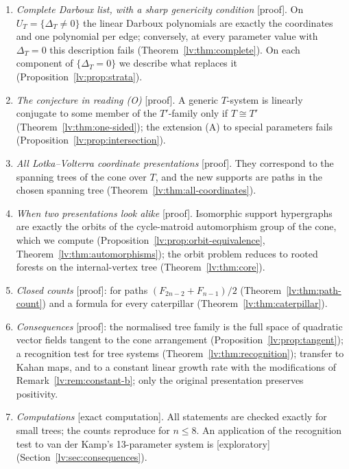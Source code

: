 \documentclass[11pt,a4paper]{article}
\theoremstyle{definition}
\theoremstyle{remark}
\newcommand{\lab}[1]{\textsf{[#1]}}
\begin{document}
\begin{enumerate}
\item \emph{Complete Darboux list, with a sharp genericity condition} \lab{proof}. On $U_T=\{\Delta_T\neq0\}$ the linear Darboux polynomials are exactly the coordinates and one polynomial per edge; conversely, at every parameter value with $\Delta_T=0$ this description fails (Theorem~\ref{lv:thm:complete}). On each component of $\{\Delta_T=0\}$ we describe what replaces it (Proposition~\ref{lv:prop:strata}).
\item \emph{The conjecture in reading (O)} \lab{proof}. A generic $T$-system is linearly conjugate to some member of the $T'$-family only if $T\cong T'$ (Theorem~\ref{lv:thm:one-sided}); the extension (A) to special parameters fails (Proposition~\ref{lv:prop:intersection}).
\item \emph{All Lotka--Volterra coordinate presentations} \lab{proof}. They correspond to the spanning trees of the cone over $T$, and the new supports are paths in the chosen spanning tree (Theorem~\ref{lv:thm:all-coordinates}).
\item \emph{When two presentations look alike} \lab{proof}. Isomorphic support hypergraphs are exactly the orbits of the cycle-matroid automorphism group of the cone, which we compute (Proposition~\ref{lv:prop:orbit-equivalence}, Theorem~\ref{lv:thm:automorphisms}); the orbit problem reduces to rooted forests on the internal-vertex tree (Theorem~\ref{lv:thm:core}).
\item \emph{Closed counts} \lab{proof}: for paths $(F_{2n-2}+F_{n-1})/2$ (Theorem~\ref{lv:thm:path-count}) and a formula for every caterpillar (Theorem~\ref{lv:thm:caterpillar}).
\item \emph{Consequences} \lab{proof}: the normalised tree family is the full space of quadratic vector fields tangent to the cone arrangement (Proposition~\ref{lv:prop:tangent}); a recognition test for tree systems (Theorem~\ref{lv:thm:recognition}); transfer to Kahan maps, and to a constant linear growth rate with the modifications of Remark~\ref{lv:rem:constant-b}; only the original presentation preserves positivity.
\item \emph{Computations} \lab{exact computation}. All statements are checked exactly for small trees; the counts reproduce \cite[Table~7]{lv:K2025} for $n\leq8$. An application of the recognition test to van der Kamp's 13-parameter system is \lab{exploratory} (Section~\ref{lv:sec:consequences}).
\end{enumerate}
\end{document}
